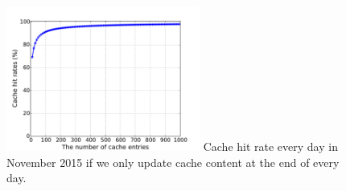 \begin{figure}[t!]
\begin{center}
\includegraphics[width=2.5in]{figure/LRU}
{Cache hit rate every day in November 2015 if we only update cache content at the end of every day.}
\end{center}
\vspace{-0.2in}
\end{figure}